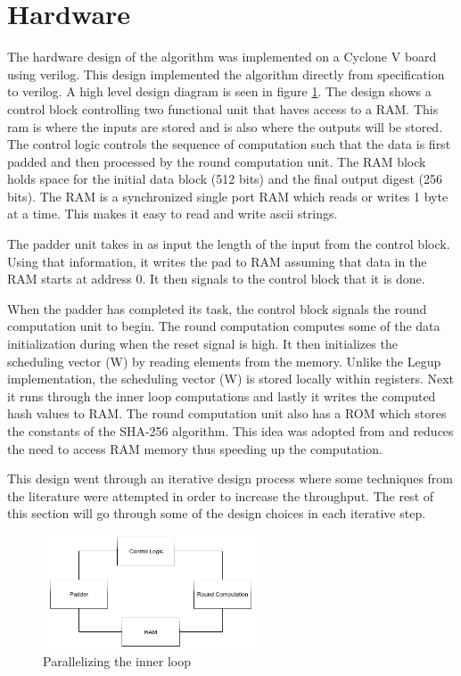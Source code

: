 \documentclass[conference]{IEEEtran}
\begin{document}
\section{Hardware} \label{Hardware}
The hardware design of the algorithm was implemented on a Cyclone V board using verilog. This design implemented the algorithm directly from specification \cite{nist} to verilog. A high level design diagram is seen in figure \ref{fig:highleveldgm}. The design shows a control block controlling two functional unit that haves access to a RAM. This ram is where the inputs are stored and is also where the outputs will be stored. The control logic controls the sequence of computation such that the data is first padded and then processed by the round computation unit. 
The RAM block holds space for the initial data block (512 bits) and the final output digest (256 bits). The RAM is a synchronized single port RAM which reads or writes 1 byte at a time. This makes it easy to read and write ascii strings. 

The padder unit takes in as input the length of the input from the control block. Using that information, it writes the pad to RAM assuming that data in the RAM starts at address 0. It then signals to the control block that it is done.

When the padder has completed its task, the control block signals the round computation unit to begin. The round computation computes some of the data initialization during when the reset signal is high. It then initializes the scheduling vector (W) by reading elements from the memory. Unlike the Legup implementation, the scheduling vector (W) is stored locally within registers. Next it runs through the inner loop computations and lastly it writes the computed hash values to RAM. The round computation unit also has a ROM which stores the constants of the SHA-256 algorithm. This idea was adopted from \cite{sklav} and reduces the need to access RAM memory thus speeding up the computation.

This design went through an iterative design process where some techniques from the literature \cite{michail} \cite{ceshar} were attempted in order to increase the throughput. The rest of this section will go through some of the design choices in each iterative step.

\begin{figure}[!t]
\centering
\includegraphics[width=2.5in]{highleveldgm}
\caption{Parallelizing the inner loop}
\label{fig:highleveldgm}
\end{figure}
\end{document}
